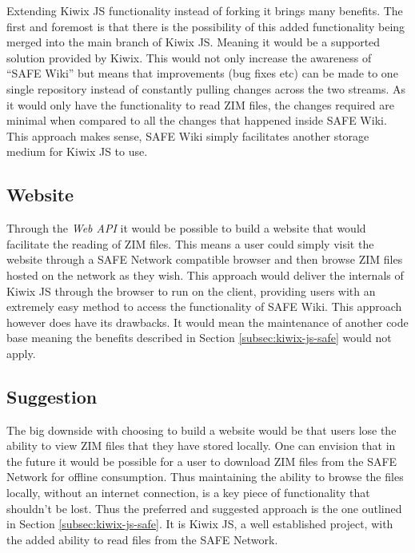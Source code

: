 Extending Kiwix JS functionality instead of forking it brings many benefits. The first and foremost is that there is the possibility of this added functionality being merged into the main branch of Kiwix JS. Meaning it would be a supported solution provided by Kiwix. This would not only increase the awareness of ``SAFE Wiki'' but means that improvements (bug fixes etc) can be made to one single repository instead of constantly pulling changes across the two streams. As it would only have the functionality to read ZIM files, the changes required are minimal when compared to all the changes that happened inside SAFE Wiki. This approach makes sense, SAFE Wiki simply facilitates another storage medium for Kiwix JS to use.

\subsection{Website}

Through the \textit{Web API} it would be possible to build a website that would facilitate the reading of ZIM files. This means a user could simply visit the website through a SAFE Network compatible browser and then browse ZIM files hosted on the network as they wish. This approach would deliver the internals of Kiwix JS through the browser to run on the client, providing users with an extremely easy method to access the functionality of SAFE Wiki. This approach however does have its drawbacks. It would mean the maintenance of another code base meaning the benefits described in Section \ref{subsec:kiwix-js-safe} would not apply.

\subsection{Suggestion}

The big downside with choosing to build a website would be that users lose the ability to view ZIM files that they have stored locally. One can envision that in the future it would be possible for a user to download ZIM files from the SAFE Network for offline consumption. Thus maintaining the ability to browse the files locally, without an internet connection, is a key piece of functionality that shouldn't be lost. Thus the preferred and suggested approach is the one outlined in Section \ref{subsec:kiwix-js-safe}. It is Kiwix JS, a well established project, with the added ability to read files from the SAFE Network.

